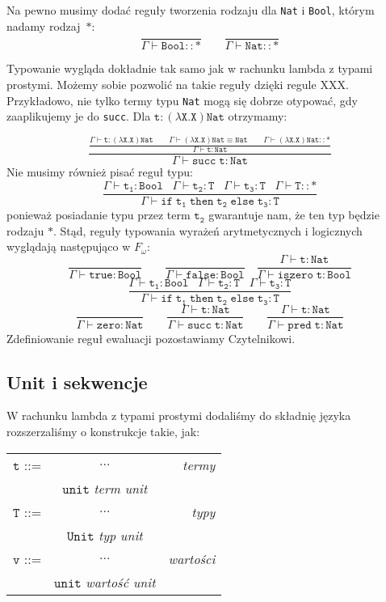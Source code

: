 \documentclass[11pt,leqno]{article}
\begin{document}
Na pewno musimy dodać reguły tworzenia rodzaju dla \texttt{Nat} i \texttt{Bool}, którym nadamy rodzaj~$\mathtt{\ast}$:
 	\[\mathtt{ \frac{}{\Gamma \vdash Bool::\ast} \qquad \frac{}{\Gamma \vdash Nat::\ast}
		}
	\]

Typowanie wygląda dokładnie tak samo jak w rachunku lambda z typami prostymi. Możemy sobie pozwolić na takie reguły dzięki regule XXX.
Przykładowo, nie tylko termy typu \texttt{Nat} mogą się dobrze otypować, gdy zaaplikujemy je do \texttt{succ}. Dla $\mathtt{t:(\lambda X.X)Nat}$
otrzymamy:

 	\[\mathtt{ \frac{\frac{\Gamma \vdash t:(\lambda X.X)Nat\hspace{2em}\Gamma \vdash (\lambda X.X)Nat \equiv Nat \hspace{2em}\Gamma \vdash (\lambda X.X)Nat::\ast}{\Gamma \vdash t:Nat}}{\Gamma \vdash succ\;t:Nat} 
		}
	\]
Nie musimy również pisać reguł typu:~\[\mathtt{\frac{\Gamma \vdash t_1:Bool \;\;\; \Gamma \vdash t_2:T \;\;\; \Gamma \vdash t_3:T\;\;\; \Gamma \vdash T::\ast}{\Gamma \vdash if\;t_1\;then\;t_2\;else\;t_3:T} 
		}
	\]
ponieważ posiadanie typu przez term $\mathtt{t_2}$ gwarantuje nam, że ten typ będzie rodzaju $\mathtt{\ast}$.
Stąd, reguły typowania wyrażeń arytmetycznych i logicznych wyglądają następująco w $F_\omega$:~\[\mathtt{ \frac{}{\Gamma \vdash true:Bool} \qquad \frac{}{\Gamma \vdash false:Bool} \quad \frac{\Gamma \vdash t:Nat}{\Gamma \vdash iszero\;t:Bool}
		}
	\]
 	\[\mathtt{\frac{\Gamma \vdash t_1:Bool \;\;\; \Gamma \vdash t_2:T \;\;\; \Gamma \vdash t_3:T}{\Gamma \vdash if\;t_1\;then\;t_2\;else\;t_3:T} 
		}
	\]
 	\[\mathtt{ \frac{}{\Gamma \vdash zero:Nat} \qquad \frac{\Gamma \vdash t:Nat}{\Gamma \vdash succ\;t:Nat} \qquad \frac{\Gamma \vdash t:Nat}{\Gamma \vdash pred\;t:Nat} 
		}
	\]
Zdefiniowanie reguł ewaluacji pozostawiamy Czytelnikowi.

\subsection{Unit i sekwencje}

W rachunku lambda z typami prostymi dodaliśmy do składnię języka rozszerzaliśmy o konstrukcje takie, jak: 

\begin{tabular}{| l c r |}
  \hline
  $\mathtt{t}$ ::= & $\dots$ & \textit{termy}  \\
   & $\mathtt{unit}$ \textit{term unit}& \\
  $\mathtt{T}$ ::= & $\dots$ & \textit{typy}  \\
   & $\mathtt{Unit}$ \textit{typ unit}& \\
  $\mathtt{v}$ ::= & $\dots$ & \textit{wartości}  \\
   & $\mathtt{unit}$ \textit{wartość unit}& \\
  \hline
\end{tabular} \\
\end{document}
